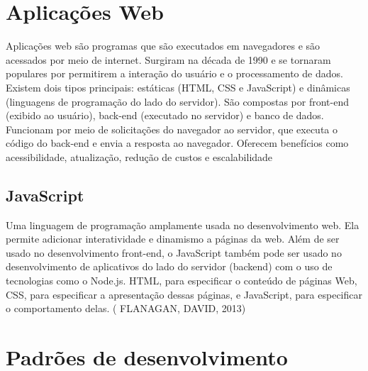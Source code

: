 \section{Aplicações Web}
Aplicações web são programas que são executados em navegadores e são acessados por meio de internet.
Surgiram na década de 1990 e se tornaram populares por permitirem a interação do usuário e o processamento de dados.
Existem dois tipos principais: estáticas (HTML, CSS e JavaScript) e dinâmicas (linguagens de programação do lado do servidor).
São compostas por front-end (exibido ao usuário), back-end (executado no servidor) e banco de dados.
Funcionam por meio de solicitações do navegador ao servidor, que executa o código do back-end e envia a resposta ao navegador.
Oferecem benefícios como acessibilidade, atualização, redução de custos e escalabilidade
\cite{amazonAplicaoWeb}

\subsection{JavaScript}
Uma linguagem de programação amplamente usada no desenvolvimento web. Ela permite adicionar interatividade e dinamismo a páginas da web. Além de ser usado no desenvolvimento front-end, o JavaScript também pode ser usado no desenvolvimento de aplicativos do lado do servidor (backend) com o uso de tecnologias como o Node.js. HTML, para especificar o conteúdo de páginas Web, CSS, para especificar a apresentação dessas páginas, e JavaScript, para especificar o comportamento delas. ( FLANAGAN, DAVID, 2013) 


\section{Padrões de desenvolvimento}


